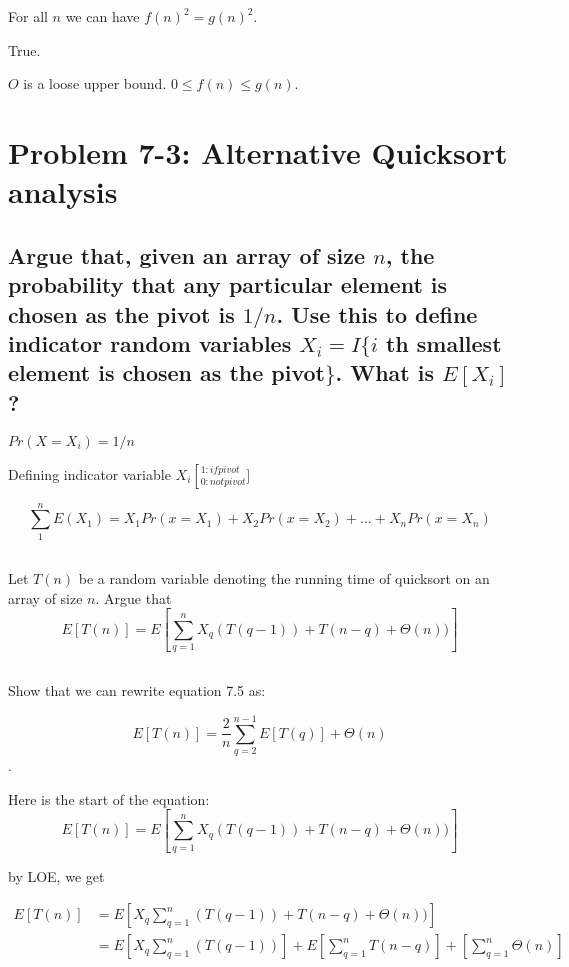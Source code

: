 \documentclass[titlepage]{article}\usepackage[]{graphicx}\usepackage[]{color}
\begin{document}
For all $n$ we can have $f(n)^2 = g(n)^2$.



True. 

$O$ is a loose upper bound. $0 \leq f(n) \leq g(n)$. 

\section{ Problem 7-3: Alternative Quicksort analysis}
\subsection{ 
Argue that, given an array of size $n$, the probability that any particular element
is chosen as the pivot is $1/n$. Use this to define indicator random variables
$X_i = I\{ i$ th smallest element is chosen as the pivot$\}$. What is
$E[X_i]$?}

$Pr(X=X_i) = 1/n$

Defining indicator variable $X_i \left[_{0: not pivot}^{1: if pivot}\right.]$

\[ \sum_{1}^{n} E(X_1) = X_1 Pr(x=X_1) + X_2Pr(x = X_2) + \dots + X_n
Pr(x=X_n) \]



\subsection{}
Let $T(n)$ be a random variable denoting the running time of quicksort on an
array of size $n$. Argue that \\
\[ E[T(n)] = E \left[ \sum_{q=1}^{n} X_q (T(q-1)) + T(n-q) + \Theta(n))\right] \]





\subsection{}
Show that we can rewrite equation 7.5 as:

\[ E[T(n) ] = \frac{2}{n} \sum_{q=2}^{n-1} E[T(q)] + \Theta(n) \].


Here is the start of the equation:
\[ E[T(n)] = E \left[ \sum_{q=1}^{n} X_q (T(q-1)) + T(n-q) + \Theta(n))\right] \]

by LOE, we get

\begin{align}
 E[T(n)] &= E \left[ X_q \sum_{q=1}^{n} (T(q-1)) + T(n-q) + \Theta(n))\right] \\
         &= E \left[ X_q \sum_{q=1}^{n} (T(q-1))\right] + E\left[ \sum_{q=1}^{n} T(n-q)\right] + \left[ \sum_{q=1}^{n}\Theta(n)\right] 

\end{align}
\end{document}
